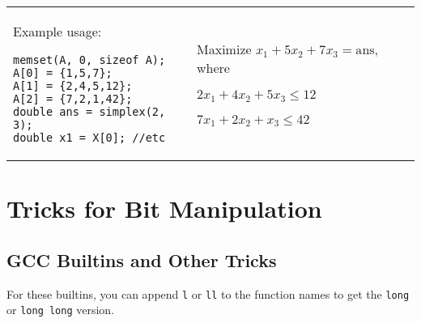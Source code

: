 \documentclass[letterpaper]{article}
\begin{document}
\begin{tabular}{@{}p{5cm}p{9cm}@{}}
Example usage:
\begin{lstlisting}
memset(A, 0, sizeof A);
A[0] = {1,5,7};
A[1] = {2,4,5,12};
A[2] = {7,2,1,42};
double ans = simplex(2, 3);
double x1 = X[0]; //etc
\end{lstlisting}
&
Maximize $x_1+5x_2+7x_3=\mathrm{ans}$, where

$2x_1+4x_2+5x_3\leq12$

$7x_1+2x_2+x_3\leq42$
\end{tabular}

\clearpage

\section{Tricks for Bit Manipulation}

\subsection{GCC Builtins and Other Tricks}

For these builtins, you can append \texttt{l} or \texttt{ll} to the function names to get the \texttt{long} or \texttt{long long} version.
\end{document}
